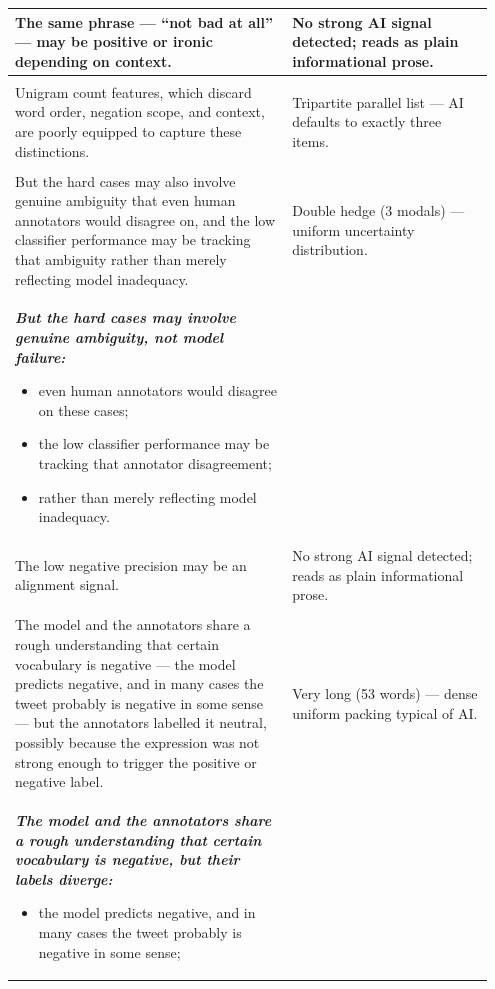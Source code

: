 \documentclass[11pt]{article}
\begin{document}
\begin{longtable}{|p{0.55\linewidth}|p{0.40\linewidth}|}
\hline
The same phrase --- ``not bad at all'' --- may be positive or ironic depending on context. & No strong AI signal detected; reads as plain informational prose. \\[2pt]
\hline
\rule{0pt}{3.5cm} & \\
\hline
Unigram count features, which discard word order, negation scope, and context, are poorly equipped to capture these distinctions. & Tripartite parallel list --- AI defaults to exactly three items. \\[2pt]
\hline
\rule{0pt}{3.5cm} & \\
\hline
But the hard cases may also involve genuine ambiguity that even human annotators would disagree on, and the low classifier performance may be tracking that ambiguity rather than merely reflecting model inadequacy. & Double hedge (3 modals) --- uniform uncertainty distribution. \\[2pt]
\hline
{\bfseries\itshape But the hard cases may involve genuine ambiguity, not model failure:
\begin{itemize}[leftmargin=*,topsep=2pt,itemsep=1pt,parsep=0pt]
  \item even human annotators would disagree on these cases;
  \item the low classifier performance may be tracking that annotator disagreement;
  \item rather than merely reflecting model inadequacy.
\end{itemize}}\vspace{2em} & \\
\hline
The low negative precision may be an alignment signal. & No strong AI signal detected; reads as plain informational prose. \\[2pt]
\hline
\rule{0pt}{3.5cm} & \\
\hline
The model and the annotators share a rough understanding that certain vocabulary is negative --- the model predicts negative, and in many cases the tweet probably is negative in some sense --- but the annotators labelled it neutral, possibly because the expression was not strong enough to trigger the positive or negative label. & Very long (53 words) --- dense uniform packing typical of AI. \\[2pt]
\hline
{\bfseries\itshape The model and the annotators share a rough understanding that certain vocabulary is negative, but their labels diverge:
\begin{itemize}[leftmargin=*,topsep=2pt,itemsep=1pt,parsep=0pt]
  \item the model predicts negative, and in many cases the tweet probably is negative in some sense;

\end{itemize}}
\end{longtable}
\end{document}
